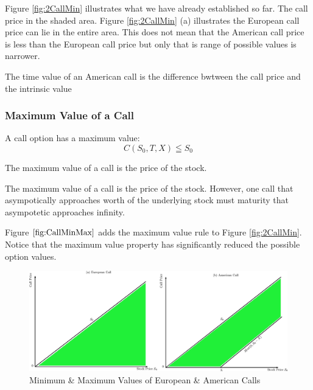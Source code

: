 \documentclass{book}
\theoremstyle{definition}
\theoremstyle{remark}
\begin{document}
            Figure \ref{fig:2CallMin} illustrates what we have already established so far. The call price in the shaded area. Figure \ref{fig:2CallMin} (a) illustrates the European call price can lie in the entire area. This does not mean that the American call price is less than the European call price but only that is range of possible values is narrower.
            
        \begin{tcolorbox}[colback=blue!5!white,colframe=blue!75!black, title=Sticky Note]
            The time value of an American call is the difference bwtween the call price and the intrinsic value
        \end{tcolorbox}              
            
        \subsubsection{Maximum Value of a Call}
            A call option has a maximum value: 
                \begin{equation}
                    C(S_0, T, X) \leqq S_0
                \end{equation}
        
        \begin{tcolorbox}[colback=blue!5!white,colframe=blue!75!black, title=Sticky Note]
            The maximum value of a call is the price of the stock. 
        \end{tcolorbox}  
            
            The maximum value of a call is the price of the stock. However, one call that asympotically approaches worth of the underlying stock must maturity that asympotetic approaches infinity.
            
            Figure $\ref{fig:CallMinMax}$ adds the maximum value rule to Figure \ref{fig:2CallMin}. Notice that the maximum value property has significantly reduced the possible option values. 
            
                \begin{figure}[h]
                    \centering
                        \includegraphics[scale=0.45]{images/fig:CallMinMax.eps}
                    \caption{Minimum \& Maximum Values of European \& American Calls}
                    \label{fig:CallMinMax}                
                \end{figure}
            
\end{document}
